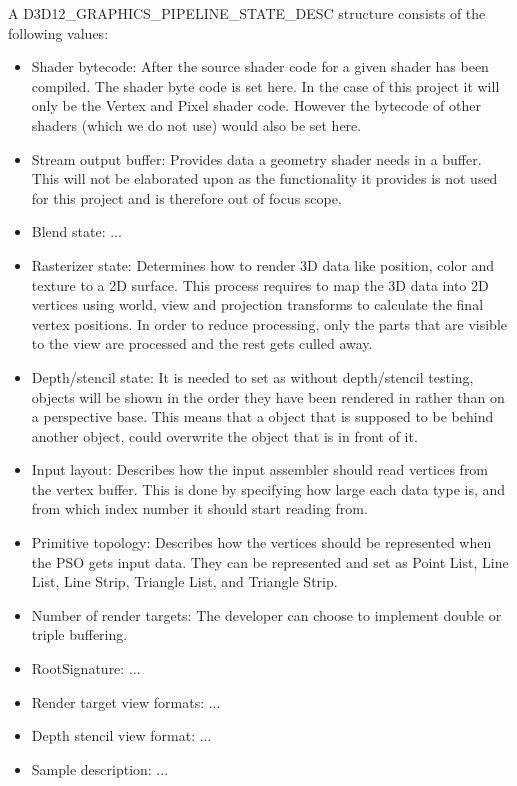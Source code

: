 A D3D12\_GRAPHICS\_PIPELINE\_STATE\_DESC structure consists of the following values:
\begin{itemize}
\item Shader bytecode:
After the source shader code for a given shader has been compiled.
The shader byte code is set here.
In the case of this project it will only be the Vertex and Pixel shader code.
However the bytecode of other shaders (which we do not use) would also be set here.

\item Stream output buffer: 
Provides data a geometry shader needs in a buffer.
This will not be elaborated upon as the functionality it provides is not used for this project and is therefore out of focus scope.

\item Blend state: ...

\item Rasterizer state: 
Determines how to render 3D data like position, color and texture to a 2D surface.
This process requires to map the 3D data into 2D vertices using world, view and projection transforms to calculate the final vertex positions.
In order to reduce processing, only the parts that are visible to the view are processed and the rest gets culled away.

\item Depth/stencil state:
It is needed to set as without depth/stencil testing, objects will be shown in the order they have been rendered in rather than on a perspective base.
This means that a object that is supposed to be behind another object, could overwrite the object that is in front of it.

\item Input layout:
Describes how the input assembler should read vertices from the vertex buffer.
This is done by specifying how large each data type is, and from which index number it should start reading from.

\item Primitive topology:
Describes how the vertices should be represented when the \gls{PSO} gets input data.
They can be represented and set as Point List, Line List, Line Strip, Triangle List, and Triangle Strip. 

\item Number of render targets: The developer can choose to implement double or triple buffering.

\item RootSignature: ...

\item Render target view formats: ...

\item Depth stencil view format: ...

\item Sample description: ...
\end{itemize}

